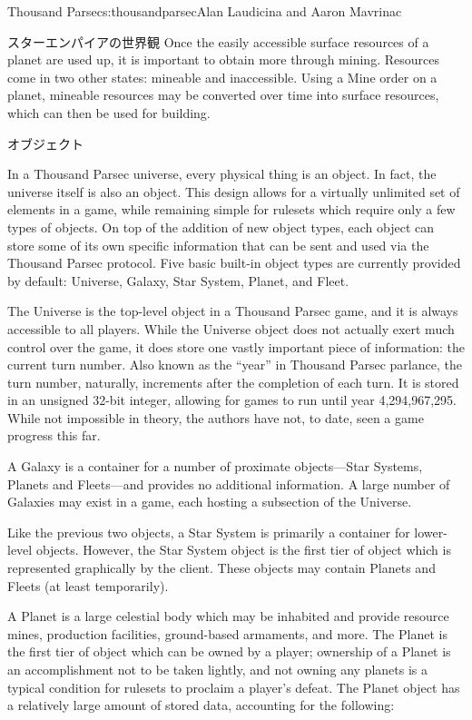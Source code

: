 \begin{aosachapter}{Thousand Parsec}{s:thousandparsec}{Alan Laudicina and Aaron Mavrinac}
\begin{aosasect1}{スターエンパイアの世界観}
Once the easily accessible surface resources of a planet are used up,
it is important to obtain more through mining. Resources come in two
other states: mineable and inaccessible. Using a Mine order on a
planet, mineable resources may be converted over time into surface
resources, which can then be used for building.

\begin{aosasect2}{オブジェクト}

In a Thousand Parsec universe, every physical thing is an object. In
fact, the universe itself is also an object. This design allows for a
virtually unlimited set of elements in a game, while remaining simple
for rulesets which require only a few types of objects. On top of the
addition of new object types, each object can store some of its own
specific information that can be sent and used via the Thousand Parsec
protocol. Five basic built-in object types are currently provided by
default: Universe, Galaxy, Star System, Planet, and Fleet.

The Universe is the top-level object in a Thousand Parsec game, and it
is always accessible to all players. While the Universe object does
not actually exert much control over the game, it does store one
vastly important piece of information: the current turn number. Also
known as the ``year'' in Thousand Parsec parlance, the turn number,
naturally, increments after the completion of each turn. It is stored
in an unsigned 32-bit integer, allowing for games to run until year
4,294,967,295. While not impossible in theory, the authors have not,
to date, seen a game progress this far.

A Galaxy is a container for a number of proximate objects---Star
Systems, Planets and Fleets---and provides no additional
information. A large number of Galaxies may exist in a game, each
hosting a subsection of the Universe.

Like the previous two objects, a Star System is primarily a container
for lower-level objects. However, the Star System object is the first
tier of object which is represented graphically by the client. These
objects may contain Planets and Fleets (at least temporarily).

A Planet is a large celestial body which may be inhabited and provide
resource mines, production facilities, ground-based armaments, and
more. The Planet is the first tier of object which can be owned by a
player; ownership of a Planet is an accomplishment not to be taken
lightly, and not owning any planets is a typical condition for
rulesets to proclaim a player's defeat. The Planet object has a
relatively large amount of stored data, accounting for the following:


\end{aosasect2}
\end{aosasect1}
\end{aosachapter}
